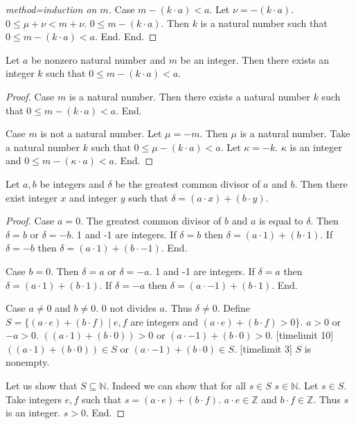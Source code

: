 \documentclass{article}
\begin{document}
\begin{forthel}
\begin{proof}[method=induction on $m$]
Case $m - (k \cdot a) < a$. Let $\nu = -(k \cdot a)$.
$0 \leq \mu + \nu < m + \nu$.
$0 \leq m - (k \cdot a)$.
Then $k$ is a natural number such that
$0 \leq  m - (k \cdot a) < a$. End.
End.
\end{proof}

\begin{lemma}
Let $a$ be nonzero natural number and $m$ be an integer.
Then there exists an integer $k$ such that $0 \leq m - (k \cdot a) < a$.
\end{lemma}
\begin{proof}
Case $m$ is a natural number. Then there exists a natural number $k$ such that $0 \leq m - (k \cdot a) < a$. End.

Case $m$ is not a natural number. Let $\mu = -m$. Then $\mu$ is a natural number.
Take a natural number $k$ such that $0 \leq \mu - (k \cdot a) < a$. Let $\kappa = -k$.
$\kappa$ is an integer and $0 \leq m - (\kappa \cdot a) < a$. End.
\end{proof}



\begin{theorem}[title=Bezout]
Let $a,b$ be integers and $\delta$ be the greatest common divisor of $a$ and $b$.
Then there exist integer $x$ and integer $y$ such that
$\delta = (a \cdot x) + (b \cdot y)$.
\end{theorem}
\begin{proof}
Case $a = 0$. The greatest common divisor of $b$ and $a$ is equal to $\delta$.
  Then $\delta = b$ or $\delta = -b$. 1 and -1 are integers.
  If $\delta = b$ then $\delta = (a \cdot 1) + (b \cdot 1)$. If $\delta = -b$ then $\delta = (a \cdot 1) + (b \cdot -1)$. End.

Case $b = 0$. Then $\delta = a$ or $\delta = -a$. 1 and -1 are integers.
  If $\delta = a$ then $\delta = (a \cdot 1) + (b \cdot 1)$. If $\delta = -a$ then $\delta = (a \cdot -1) + (b \cdot 1)$. End.

Case $a \neq  0$ and $b \neq 0$.
  $0$ not divides $a$. Thus $\delta \neq 0$.
  Define $S = \{ (a \cdot e) + (b \cdot f) \mid e,f$ are integers and
  $(a \cdot e) + (b \cdot f) > 0\}$.
  $a > 0$ or $-a > 0$.
  $((a \cdot 1) + (b \cdot 0)) > 0$ or $(a \cdot -1) + (b \cdot 0) > 0$.
  [timelimit 10] $((a \cdot 1) + (b \cdot 0)) \in S$ or $(a \cdot -1) + (b \cdot 0) \in S$. [timelimit 3]
  $S$ is nonempty.

  Let us show that $S \subseteq \mathbb{N}$.
    Indeed we can show that for all $s \in S$ $s \in \mathbb{N}$.
    Let $s \in S$.
    Take integers $e,f$ such that $s = (a \cdot e) + (b \cdot f)$.
    $a \cdot e \in \mathbb{Z}$ and $b \cdot f \in \mathbb{Z}$. Thus $s$ is an integer.
    $s > 0$.
  End.



\end{proof}
\end{forthel}
\end{document}
